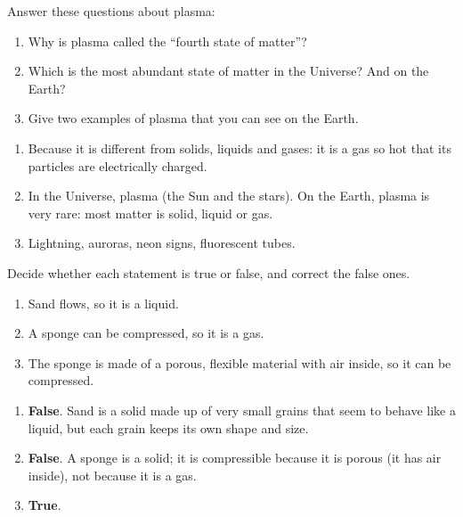 \begin{exercise}
    Answer these questions about plasma:
    \begin{enumerate}[label=\letraminuscula]
        \item Why is plasma called the ``fourth state of matter''?
        \item Which is the most abundant state of matter in the Universe? And on the Earth?
        \item Give two examples of plasma that you can see on the Earth.
    \end{enumerate}
    \begin{solu}
        \begin{enumerate}[label=\alph*)]
            \item Because it is different from solids, liquids and gases: it is a gas so hot that its particles are electrically charged.
            \item In the Universe, plasma (the Sun and the stars). On the Earth, plasma is very rare: most matter is solid, liquid or gas.
            \item Lightning, auroras, neon signs, fluorescent tubes.
        \end{enumerate}
    \end{solu}
\end{exercise}

\begin{exercise}
    Decide whether each statement is true or false, and correct the false ones.
    \begin{enumerate}[label=\letraminuscula]
        \item Sand flows, so it is a liquid.
        \item A sponge can be compressed, so it is a gas.
        \item The sponge is made of a porous, flexible material with air inside, so it can be compressed.
    \end{enumerate}
    \begin{solu}
        \begin{enumerate}[label=\alph*)]
            \item \textbf{False}. Sand is a solid made up of very small grains that seem to behave like a liquid, but each grain keeps its own shape and size.
            \item \textbf{False}. A sponge is a solid; it is compressible because it is porous (it has air inside), not because it is a gas.
            \item \textbf{True}.
        \end{enumerate}
    \end{solu}
\end{exercise}


